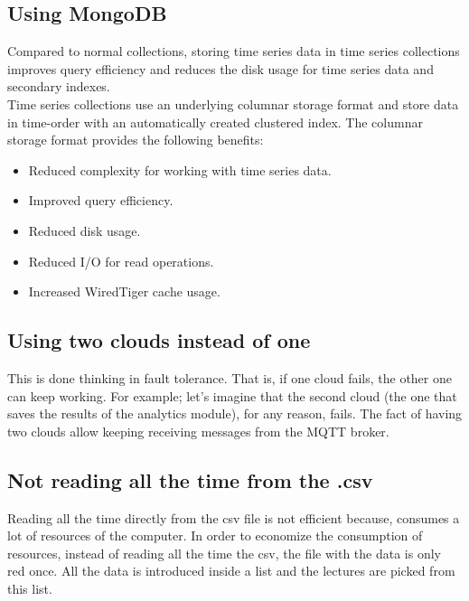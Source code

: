 \documentclass[a4paper,12pt]{article}
\begin{document}
\subsection*{Using MongoDB}
Compared to normal collections, storing time series data in time series collections improves query efficiency and reduces the disk usage for time series data and secondary indexes.\\
Time series collections use an underlying columnar storage format and store data in time-order with an automatically created clustered index. The columnar storage format provides the following benefits:
\begin{itemize}
    \item Reduced complexity for working with time series data.
    \item Improved query efficiency.
    \item Reduced disk usage.
    \item Reduced I/O for read operations.
    \item Increased WiredTiger cache usage.
\end{itemize}

\subsection*{Using two clouds instead of one}
This is done thinking in fault tolerance. That is, if one cloud fails, the other one can keep working. For example; let's imagine that the second cloud (the one that saves the results of the analytics module), for any reason, fails. The fact of having two clouds allow keeping receiving messages from the MQTT broker.

\subsection*{Not reading all the time from the .csv}
Reading all the time directly from the csv file is not efficient because, consumes a lot of resources of the computer. In order to economize the consumption of resources, instead of reading all the time the csv, the file with the data is only red once. All the data is introduced inside a list and the lectures are picked from this list.
\end{document}
